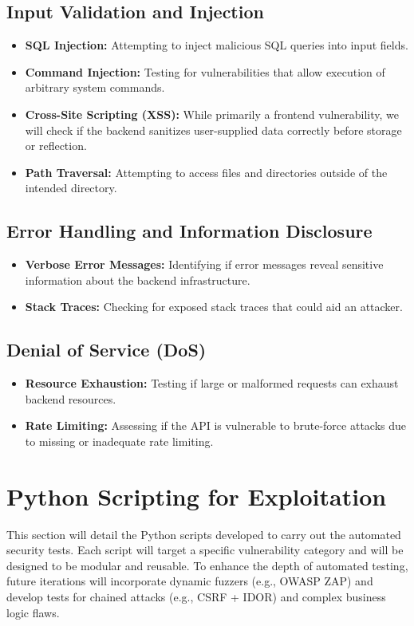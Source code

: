 \documentclass{article}
\begin{document}
\subsection{Input Validation and Injection}
\begin{itemize}
    \item \textbf{SQL Injection:} Attempting to inject malicious SQL queries into input fields.
    \item \textbf{Command Injection:} Testing for vulnerabilities that allow execution of arbitrary system commands.
    \item \textbf{Cross-Site Scripting (XSS):} While primarily a frontend vulnerability, we will check if the backend sanitizes user-supplied data correctly before storage or reflection.
    \item \textbf{Path Traversal:} Attempting to access files and directories outside of the intended directory.
\end{itemize}

\subsection{Error Handling and Information Disclosure}
\begin{itemize}
    \item \textbf{Verbose Error Messages:} Identifying if error messages reveal sensitive information about the backend infrastructure.
    \item \textbf{Stack Traces:} Checking for exposed stack traces that could aid an attacker.
\end{itemize}

\subsection{Denial of Service (DoS)}
\begin{itemize}
    \item \textbf{Resource Exhaustion:} Testing if large or malformed requests can exhaust backend resources.
    \item \textbf{Rate Limiting:} Assessing if the API is vulnerable to brute-force attacks due to missing or inadequate rate limiting.
\end{itemize}

\section{Python Scripting for Exploitation}
This section will detail the Python scripts developed to carry out the automated security tests. Each script will target a specific vulnerability category and will be designed to be modular and reusable. To enhance the depth of automated testing, future iterations will incorporate dynamic fuzzers (e.g., OWASP ZAP) and develop tests for chained attacks (e.g., CSRF + IDOR) and complex business logic flaws.
\end{document}
